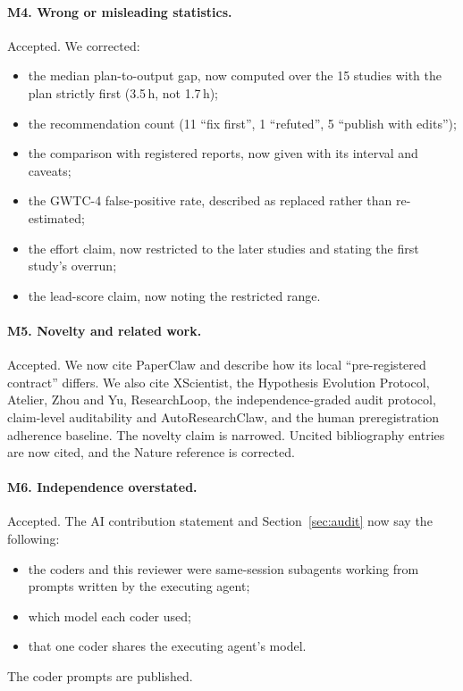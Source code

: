 \paragraph{M4. Wrong or misleading statistics.} Accepted. We corrected:
\begin{itemize}
\item the median plan-to-output gap, now computed over the 15 studies with the plan strictly first (3.5\,h, not
1.7\,h);
\item the recommendation count (11 ``fix first'', 1 ``refuted'', 5 ``publish with edits'');
\item the comparison with registered reports, now given with its interval and caveats;
\item the GWTC-4 false-positive rate, described as replaced rather than re-estimated;
\item the effort claim, now restricted to the later studies and stating the first study's overrun;
\item the lead-score claim, now noting the restricted range.
\end{itemize}

\paragraph{M5. Novelty and related work.} Accepted. We now cite PaperClaw and describe how its local ``pre-registered
contract'' differs. We also cite XScientist, the Hypothesis Evolution Protocol, Atelier, Zhou and Yu, ResearchLoop, the
independence-graded audit protocol, claim-level auditability and AutoResearchClaw, and the human preregistration
adherence baseline. The novelty claim is narrowed. Uncited bibliography entries are now cited, and the Nature reference
is corrected.

\paragraph{M6. Independence overstated.} Accepted. The AI contribution statement and Section~\ref{sec:audit} now say
the following:
\begin{itemize}
\item the coders and this reviewer were same-session subagents working from prompts written by the executing agent;
\item which model each coder used;
\item that one coder shares the executing agent's model.
\end{itemize}
The coder prompts are published.


